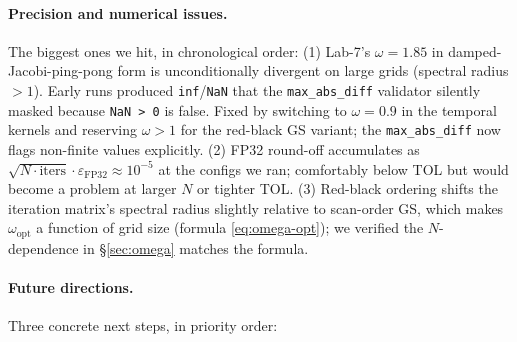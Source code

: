 \documentclass[11pt]{article}
\begin{document}
\paragraph{Precision and numerical issues.}  The biggest ones we
hit, in chronological order: (1) Lab-7's $\omega{=}1.85$ in damped-
Jacobi-ping-pong form is unconditionally divergent on large grids
(spectral radius $> 1$). Early runs produced \texttt{inf}/\texttt{NaN}
that the \texttt{max\_abs\_diff} validator silently masked because
\texttt{NaN > 0} is false.  Fixed by switching to $\omega{=}0.9$ in
the temporal kernels and reserving $\omega{>}1$ for the red-black
GS variant; the \texttt{max\_abs\_diff} now flags non-finite values
explicitly.  (2) FP32 round-off accumulates as
$\sqrt{N\cdot\text{iters}}\cdot\varepsilon_{\text{FP32}} \approx
10^{-5}$ at the configs we ran; comfortably below TOL but would
become a problem at larger $N$ or tighter TOL.  (3) Red-black ordering
shifts the iteration matrix's spectral radius slightly relative to
scan-order GS, which makes $\omega_{\text{opt}}$ a function of grid
size (formula \eqref{eq:omega-opt}); we verified the
$N$-dependence in §\ref{sec:omega} matches the formula.

\paragraph{Future directions.}  Three concrete next steps, in
priority order:
\end{document}
